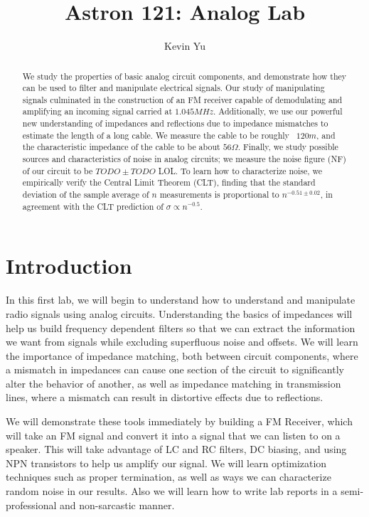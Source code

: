 \documentclass[12pt]{article}
\title {Astron 121: Analog Lab}
\author {
Kevin Yu
}
\begin{document}
\maketitle

\begin{abstract}
We study the properties of basic analog circuit components, and demonstrate how they can be used to filter and manipulate electrical signals. Our study of manipulating signals culminated in the construction of an FM receiver capable of demodulating and amplifying an incoming signal carried at $1.045MHz$. Additionally, we use our powerful new understanding of impedances and reflections due to impedance mismatches to estimate the length of a long cable. We measure the cable to be roughly ~$120m$, and the characteristic impedance of the cable to be about $56\Omega$. Finally, we study possible sources and characteristics of noise in analog circuits; we measure the noise figure (NF) of our circuit to be $TODO \pm TODO$ LOL. To learn how to characterize noise, we empirically verify the Central Limit Theorem (CLT), finding that the standard deviation of the sample average of $n$ measurements is proportional to $n^{-0.51\pm0.02}$, in agreement with the CLT prediction of $\sigma \propto n^{-0.5}$.
\end{abstract}

\section*{Introduction}
In this first lab, we will begin to understand how to understand and manipulate radio signals using analog circuits. Understanding the basics of impedances will help us build frequency dependent filters so that we can extract the information we want from signals while excluding superfluous noise and offsets. We will learn the importance of impedance matching, both between circuit components, where a mismatch in impedances can cause one section of the circuit to significantly alter the behavior of another, as well as impedance matching in transmission lines, where a mismatch can result in distortive effects due to reflections.

We will demonstrate these tools immediately by building a FM Receiver, which will take an FM signal and convert it into a signal that we can listen to on a speaker. This will take advantage of LC and RC filters, DC biasing, and using NPN transistors to help us amplify our signal. We will learn optimization techniques such as proper termination, as well as ways we can characterize random noise in our results. Also we will learn how to write lab reports in a semi-professional and non-sarcastic manner.
\end{document}
